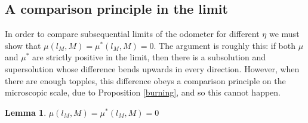 \documentclass[12pt]{amsart}
\newtheorem{lemma}[theorem]{Lemma}
\begin{document}
\subsection{A comparison principle in the limit} 
In order to compare subsequential limits of the odometer for different $\eta$ we must show that $\mu(l_M, M) = \mu^*(l_M,M) = 0$.
The argument is roughly this: if both $\mu$ and $\mu^*$ are strictly positive in the limit, then there is a subsolution and supersolution whose difference bends upwards in every direction.
However, when there are enough topples, this difference obeys a comparison principle on the microscopic scale, due to Proposition \ref{burning},
and so this cannot happen. 


\begin{lemma} \label{flat}
$\mu(l_M,M) = \mu^*(l_M,M) = 0$
\end{lemma}
\end{document}

